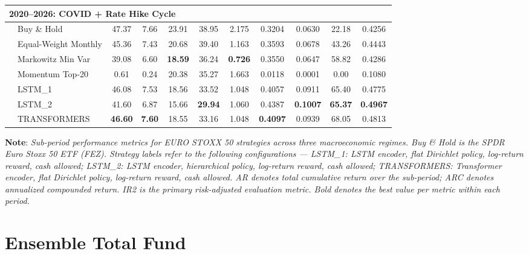 \documentclass[]{elsarticle}
\begin{document}
\begin{table}[H]
{\begin{tabular}{llccccccccc}
\multicolumn{11}{l}{\textbf{2020--2026: COVID + Rate Hike Cycle}} \\
\midrule
& Buy \& Hold          & 47.37  & 7.66  & 23.91 & 38.95 & 2.175 & 0.3204  & 0.0630   & 22.18     & 0.4256 \\
& Equal-Weight Monthly & 45.36  & 7.43  & 20.68 & 39.40 & 1.163 & 0.3593  & 0.0678   & 43.26     & 0.4443 \\
& Markowitz Min Var    & 39.08  & 6.60  & \textbf{18.59} & 36.24 & \textbf{0.726} & 0.3550  & 0.0647   & 58.82     & 0.4286 \\
& Momentum Top-20      & 0.61   & 0.24  & 20.38 & 35.27 & 1.663 & 0.0118   & 0.0001   & 0.00      & 0.1080 \\
& LSTM\_1              & 46.08  & 7.53  & 18.56 & 33.52 & 1.048 & 0.4057  & 0.0911   & 65.40     & 0.4775 \\
& LSTM\_2              & 41.60  & 6.87  & 15.66 & \textbf{29.94} & 1.060 & 0.4387  & \textbf{0.1007}  & \textbf{65.37}    & \textbf{0.4967} \\
& TRANSFORMERS         & \textbf{46.60} & \textbf{7.60} & 18.55 & 33.16 & 1.048 & \textbf{0.4097}  & 0.0939   & 68.05     & 0.4813 \\

\bottomrule
\end{tabular}}
\end{table}
\vspace{-0.4cm}
\noindent\linespread{0.65}\selectfont
{\scriptsize \textbf{Note}: \textit{Sub-period performance metrics for EURO STOXX 50 strategies across three macroeconomic regimes. Buy \& Hold is the SPDR Euro Stoxx 50 ETF (FEZ). Strategy labels refer to the following configurations --- LSTM\_1: LSTM encoder, flat Dirichlet policy, log-return reward, cash allowed; LSTM\_2: LSTM encoder, hierarchical policy, log-return reward, cash allowed; TRANSFORMERS: Transformer encoder, flat Dirichlet policy, log-return reward, cash allowed. AR denotes total cumulative return over the sub-period; ARC denotes annualized compounded return. IR2 is the primary risk-adjusted evaluation metric. Bold denotes the best value per metric within each period.}}

\linespread{1.5}\selectfont

\newpage

\hypertarget{ensemble}{%
\section{Ensemble Total Fund}\label{ensemble}}
\end{document}
